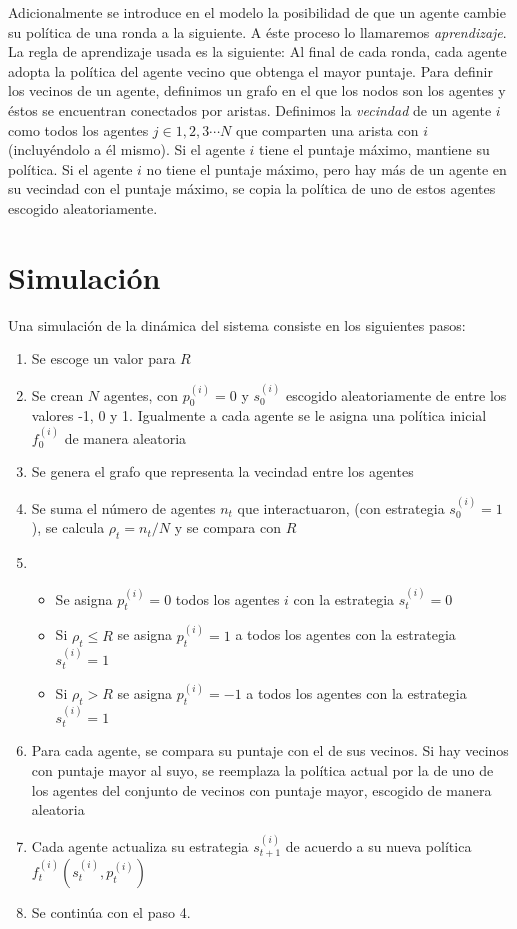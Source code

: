 \documentclass[amsmath,amssymb]{article}
\begin{document}
Adicionalmente se introduce en el modelo la posibilidad de que un agente cambie su política de una ronda a la siguiente. A éste proceso lo llamaremos {\it aprendizaje}. La regla de aprendizaje usada es la siguiente: Al final de cada ronda, cada agente adopta la política del agente vecino que obtenga el mayor puntaje. Para definir los vecinos de un agente, definimos un grafo en el que los nodos son los agentes y éstos se encuentran conectados por aristas. Definimos la {\it vecindad} de un agente $i$ como todos los agentes $j\in 1,2,3\cdots N$ que comparten una arista con $i$ (incluyéndolo a él mismo). Si el agente $i$ tiene el puntaje máximo, mantiene su política. Si el agente $i$ no tiene el puntaje máximo, pero hay más de un agente en su vecindad con el puntaje máximo, se copia la política de uno de estos agentes escogido aleatoriamente.\\

\section*{Simulación}
Una simulación de la dinámica del sistema consiste en los siguientes pasos:
\begin{enumerate}
\item Se escoge un valor para $R$
\item Se crean $N$ agentes, con $p_0^{(i)}=0$ y $s_0^{(i)}$ escogido aleatoriamente de entre los valores -1, 0 y 1. Igualmente a cada agente se le asigna una política inicial $f_0^{(i)}$ de manera aleatoria
\item Se genera el grafo que representa la vecindad entre los agentes
\item Se suma el número de agentes $n_t$ que interactuaron, (con estrategia $s_0^{(i)}=1$), se calcula $\rho_t=n_t/N$ y se compara con $R$
\item
  \begin{itemize}
  \item Se asigna $p_t^{(i)}=0$ todos los agentes $i$ con la estrategia $s_t^{(i)}=0$
  \item Si $\rho_t\leq R$ se asigna $p_t^{(i)}=1$ a todos los agentes con la estrategia $s_t^{(i)}=1$
  \item Si $\rho_t>R$ se asigna $p_t^{(i)}=-1$ a todos los agentes con la estrategia $s_t^{(i)}=1$
  \end{itemize}
\item Para cada agente, se compara su puntaje con el de sus vecinos. Si hay vecinos con puntaje mayor al suyo, se reemplaza la política actual por la de uno de los agentes del conjunto de vecinos con puntaje mayor, escogido de manera aleatoria
\item Cada agente actualiza su estrategia $s_{t+1}^{(i)}$ de acuerdo a su nueva política $f_t^{(i)}(s_{t}^{(i)},p_{t}^{(i)})$
\item Se continúa con el paso 4.
\end{enumerate}
     
\end{document}
